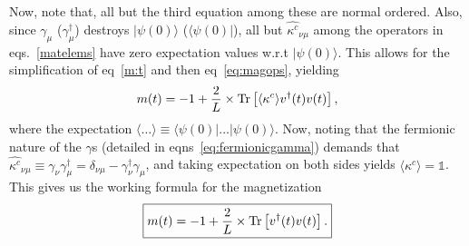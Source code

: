 \documentclass[a4paper,10pt]{article}
\begin{document}
Now, note that, all but the third equation among these are normal ordered. Also, since $\gamma_\mu$ ($\gamma^\dagger_\mu$) destroys $|\psi(0)\rangle$ ($\langle\psi(0)|$), all but $\hat{\kappa^c}_{\nu\mu}$ among the operators in eqs.~\ref{matelems} have zero expectation values w.r.t $|\psi(0)\rangle$. This allows for the simplification of eq~\ref{m:t} and then eq~\ref{eq:magops}, yielding
\begin{equation}
m(t) = -1+\frac{2}{L} \times {\rm Tr}\left[\langle\kappa^c\rangle {v}^\dagger(t) {v}(t)\right],
\end{equation}
where the expectation $\langle\dots\rangle\equiv \langle\psi(0)|\dots|\psi(0)\rangle$. Now, noting that the fermionic nature of the $\gamma$s (detailed in eqns~\ref{eq:fermionicgamma}) demands that $\hat{\kappa^c}_{\nu\mu}\equiv\gamma_\nu\gamma^\dagger_\mu=\delta_{\nu\mu}-\gamma^\dagger_\nu\gamma_\mu$, and taking expectation on both sides yields $\langle\kappa^c\rangle=\mathds{1}$. This gives us the working formula for the magnetization
\begin{equation}
 \label{eq:mag}
\boxed{m(t) = -1+\frac{2}{L} \times {\rm Tr}\left[ {v}^\dagger(t) {v}(t)\right].}
\end{equation}
\end{document}
